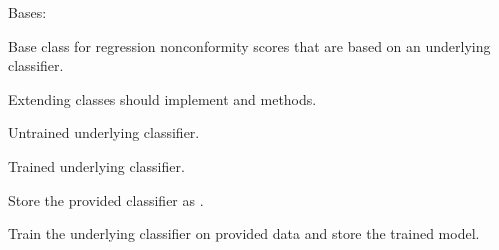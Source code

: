 \documentclass[letterpaper,10pt,english]{sphinxmanual}
\begin{document}

\begin{fulllineitems}
\label{cp.nonconformity:cp.nonconformity.RegrModelNC}
Bases: {\hyperref[cp.nonconformity:cp.nonconformity.RegrNC]{}}

Base class for regression nonconformity scores that are based on an underlying classifier.

Extending classes should implement {\hyperref[cp.nonconformity:cp.nonconformity.RegrNC.nonconformity]{}} and {\hyperref[cp.nonconformity:cp.nonconformity.RegrNC.predict]{}} methods.

\begin{fulllineitems}
\label{cp.nonconformity:cp.nonconformity.RegrModelNC.learner}
Untrained underlying classifier.

\end{fulllineitems}


\begin{fulllineitems}
\label{cp.nonconformity:cp.nonconformity.RegrModelNC.model}
Trained underlying classifier.

\end{fulllineitems}


\begin{fulllineitems}
\label{cp.nonconformity:cp.nonconformity.RegrModelNC.__init__}
Store the provided classifier as {\hyperref[cp.nonconformity:cp.nonconformity.RegrModelNC.learner]{}}.

\end{fulllineitems}


\begin{fulllineitems}
\label{cp.nonconformity:cp.nonconformity.RegrModelNC.fit}
Train the underlying classifier on provided data and store the trained model.

\end{fulllineitems}


\end{fulllineitems}
\end{document}
